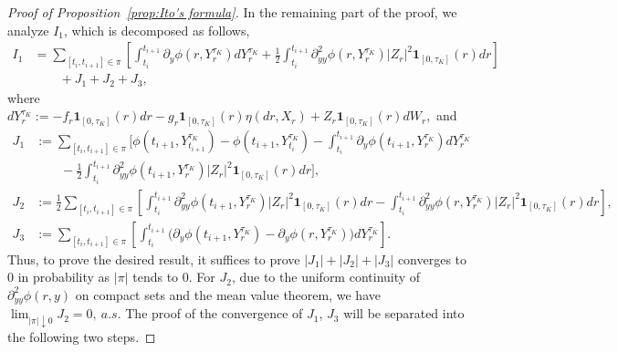 \documentclass[11pt,reqno]{amsart}
\numberwithin{equation}{section}
\begin{document}
\begin{proof}[Proof of Proposition~\ref{prop:Ito's formula}]
In the remaining part of the proof, we analyze $I_{1}$, which is decomposed as follows,
\begin{equation}\label{e:I1}	\begin{aligned}
I_{1} &= \sum_{[t_{i},t_{i+1}]\in \pi}\left[\int_{t_{i}}^{t_{i+1}}\partial_{y}\phi(r,Y^{\tau_{K}}_{r})dY^{\tau_{K}}_{r} + \frac{1}{2}\int_{t_{i}}^{t_{i+1}}\partial^{2}_{yy}\phi(r,Y^{\tau_{K}}_{r})|Z_{r}|^{2}\mathbf{1}_{[0,\tau_{K}]}(r) dr\right]\\
& \qquad + J_{1} + J_{2} + J_{3},
\end{aligned}
\end{equation}
where $dY^{\tau_{K}}_{r} := -f_{r}\mathbf{1}_{[0,\tau_{K}]}(r)dr - g_{r}\mathbf{1}_{[0,\tau_{K}]}(r)\eta(dr,X_{r}) + Z_{r}\mathbf{1}_{[0,\tau_{K}]}(r) dW_{r},$ and
\begin{align*}
J_{1} &:= \sum_{[t_{i},t_{i+1}]\in \pi} \Bigg[\phi(t_{i+1},Y^{\tau_{K}}_{t_{i+1}}) - \phi(t_{i+1},Y^{\tau_{K}}_{t_{i}}) - \int_{t_{i}}^{t_{i+1}}\partial_{y}\phi(t_{i+1},Y^{\tau_{K}}_{r}) dY^{\tau_{K}}_{r}\\
&\qquad  - \frac{1}{2}\int_{t_{i}}^{t_{i+1}}\partial^{2}_{yy}\phi(t_{i+1},Y^{\tau_{K}}_{r})|Z_{r}|^{2}\mathbf{1}_{[0,\tau_{K}]}(r)dr\Bigg],\\
J_{2} &:= \frac{1}{2}\sum_{[t_{i},t_{i+1}]\in \pi}\left[\int_{t_{i}}^{t_{i+1}}\partial^{2}_{yy}\phi(t_{i+1},Y^{\tau_{K}}_{r})|Z_{r}|^{2}\mathbf{1}_{[0,\tau_{K}]}(r)dr - \int_{t_{i}}^{t_{i+1}}\partial^{2}_{yy}\phi(r,Y^{\tau_{K}}_{r})|Z_{r}|^{2}\mathbf{1}_{[0,\tau_{K}]}(r)dr\right],\\
J_{3} &:= \sum_{[t_{i},t_{i+1}]\in\pi}\left[\int_{t_{i}}^{t_{i+1}}\big(\partial_{y}\phi(t_{i+1},Y^{\tau_{K}}_{r}) - \partial_{y}\phi(r,Y^{\tau_{K}}_{r})\big) dY^{\tau_{K}}_{r}\right].
\end{align*}
Thus, to prove the desired result, it suffices to prove $|J_1|+|J_2| +|J_3|$ converges to 0 in probability as $|\pi|$ tends to 0. For $J_{2}$, due to the uniform continuity of $\partial^{2}_{yy}\phi(r,y)$ on compact sets and the mean value theorem, we have 
$\lim_{|\pi|\downarrow 0}J_{2} = 0,\ a.s.$  The proof of the convergence of $J_1$, $J_3$ will be separated into the following two steps.


\end{proof}
\end{document}
